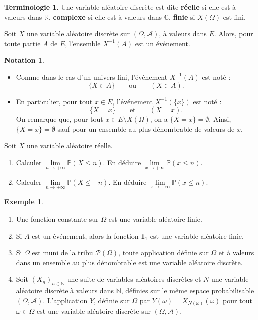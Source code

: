 \documentclass[french]{article}
\renewcommand{\P}{\mathbb{P}}
\newcommand{\N}{\mathbb{N}}
\newcommand{\R}{\mathbb{R}}
\newcommand{\C}{\mathbb{C}}
\newcommand{\inv}{^{-1}}
\theoremstyle{plain}
\theoremstyle{definition}
\newtheorem*{ex}{Exemple}
\newtheorem*{notation}{Notation}
\newtheorem*{terminologie}{Terminologie}
\theoremstyle{remark}
\begin{document}
\begin{terminologie}
	Une variable aléatoire discrète est dite \textbf{réelle} si elle est à valeurs dans $\R$, \textbf{complexe} si elle est à valeurs dans $\C$, \textbf{finie} si $X(\Omega)$ est fini.
\end{terminologie}

\begin{prop}%
	Soit $X$ une variable aléatoire discrète sur $(\Omega,\mathcal{A})$, à valeurs dans $E$. Alors, pour toute partie $A$ de $E$, l'ensemble $X\inv(A)$ est un événement.
\end{prop}

\begin{notation}
	\begin{itemize}
		\item Comme dans le cas d'un univers fini, l'événement $X\inv(A)$ est noté :
		$$\{X\in A\}\quad\quad\text{ou}\quad\quad (X\in A).$$
		\item En particulier, pour tout $x\in E$, l'événement $X\inv(\{x\})$ est noté :
		$$\{X=x\}\quad\quad\text{et}\quad\quad(X=x).$$
		On remarque que, pour tout $x\in E\setminus X(\Omega)$, on a $\{X=x\}=\emptyset$. Ainsi, $\{X=x\}=\emptyset$ sauf pour un ensemble au plus dénombrable de valeurs de $x$.
	\end{itemize}
\end{notation}

\begin{exo}
	Soit $X$ une variable aléatoire réelle.
	\begin{enumerate}
		\item Calculer $\underset{n\to+\infty}{\lim}\P(X\leqslant n)$. En déduire $\underset{x\to+\infty}{\lim}\P(x\leqslant n)$.
		\item Calculer $\underset{n\to+\infty}{\lim}\P(X\leqslant -n)$. En déduire $\underset{x\to-\infty}{\lim}\P(x\leqslant n)$.
	\end{enumerate}
\end{exo}

\begin{ex}
	\begin{enumerate}
		\item Une fonction constante sur $\Omega$ est une variable aléatoire finie.
		\item Si $A$ est un événement, alors la fonction $\textbf{1}_1$ est une variable aléatoire finie.
		\item Si $\Omega$ est muni de la tribu $\mathcal{P}(\Omega)$, toute application définie sur $\Omega$ et à valeurs dans un ensemble au plus dénombrable est une variable aléatoire discrète.
		\item Soit $(X_n)_{n\in\N}$ une suite de variables aléatoires discrètes et $N$ une variable aléatoire discrète à valeurs dans $\N$, définies sur le même espace probabilisable $(\Omega,\mathcal{A})$. L'application $Y$, définie sur $\Omega$ par $Y(\omega)=X_{N(\omega)}(\omega)$ pour tout $\omega\in\Omega$ est une variable aléatoire discrète sur $(\Omega,\mathcal{A})$.
	\end{enumerate}
\end{ex}
\end{document}
